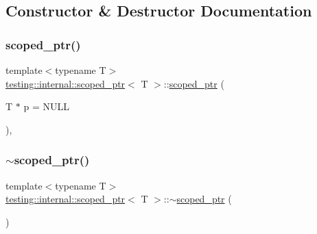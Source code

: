 \subsection{Constructor \& Destructor Documentation}
\mbox{\label{classtesting_1_1internal_1_1scoped__ptr_adb972432999a0c63720df148964ac2a5}} 
\subsubsection{\texorpdfstring{scoped\_ptr()}{scoped\_ptr()}}
{\footnotesize\ttfamily template$<$typename T$>$ \\
\mbox{\hyperlink{classtesting_1_1internal_1_1scoped__ptr}{testing\+::internal\+::scoped\+\_\+ptr}}$<$ T $>$\+::\mbox{\hyperlink{classtesting_1_1internal_1_1scoped__ptr}{scoped\+\_\+ptr}} (\begin{DoxyParamCaption}\item[{T $\ast$}]{p = {\ttfamily NULL} }\end{DoxyParamCaption})\hspace{0.3cm}{\ttfamily [inline]}, {\ttfamily [explicit]}}

\mbox{\label{classtesting_1_1internal_1_1scoped__ptr_ab721de9bf4369f002fb563e82352ee36}} 
\subsubsection{\texorpdfstring{$\sim$scoped\_ptr()}{~scoped\_ptr()}}
{\footnotesize\ttfamily template$<$typename T$>$ \\
\mbox{\hyperlink{classtesting_1_1internal_1_1scoped__ptr}{testing\+::internal\+::scoped\+\_\+ptr}}$<$ T $>$\+::$\sim$\mbox{\hyperlink{classtesting_1_1internal_1_1scoped__ptr}{scoped\+\_\+ptr}} (\begin{DoxyParamCaption}{ }\end{DoxyParamCaption})\hspace{0.3cm}{\ttfamily [inline]}}



